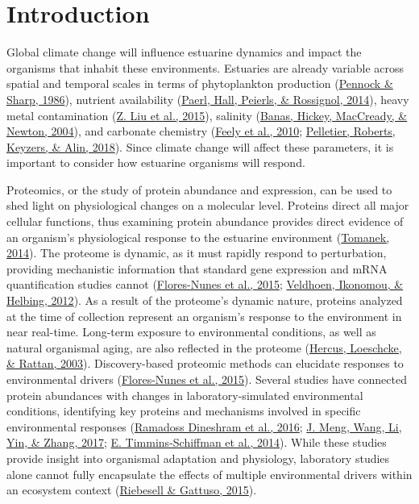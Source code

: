 \documentclass [11pt, proquest] {uwthesis}[2015/03/03]
\begin{document}
\hypertarget{introduction-1}{%
\section{Introduction}\label{introduction-1}}

Global climate change will influence estuarine dynamics and impact the organisms that inhabit these environments. Estuaries are already variable across spatial and temporal scales in terms of phytoplankton production (\protect\hyperlink{ref-Pennock1986}{Pennock \& Sharp, 1986}), nutrient availability (\protect\hyperlink{ref-Paerl2014}{Paerl, Hall, Peierls, \& Rossignol, 2014}), heavy metal contamination (\protect\hyperlink{ref-Liu2015}{Z. Liu et al., 2015}), salinity (\protect\hyperlink{ref-Banas2004}{Banas, Hickey, MacCready, \& Newton, 2004}), and carbonate chemistry (\protect\hyperlink{ref-Feely2010}{Feely et al., 2010}; \protect\hyperlink{ref-Pelletier2018}{Pelletier, Roberts, Keyzers, \& Alin, 2018}). Since climate change will affect these parameters, it is important to consider how estuarine organisms will respond.

Proteomics, or the study of protein abundance and expression, can be used to shed light on physiological changes on a molecular level. Proteins direct all major cellular functions, thus examining protein abundance provides direct evidence of an organism's physiological response to the estuarine environment (\protect\hyperlink{ref-Tomanek2014}{Tomanek, 2014}). The proteome is dynamic, as it must rapidly respond to perturbation, providing mechanistic information that standard gene expression and mRNA quantification studies cannot (\protect\hyperlink{ref-Flores-Nunes2015}{Flores-Nunes et al., 2015}; \protect\hyperlink{ref-Veldhoen2012}{Veldhoen, Ikonomou, \& Helbing, 2012}). As a result of the proteome's dynamic nature, proteins analyzed at the time of collection represent an organism's response to the environment in near real-time. Long-term exposure to environmental conditions, as well as natural organismal aging, are also reflected in the proteome (\protect\hyperlink{ref-Hercus2003}{Hercus, Loeschcke, \& Rattan, 2003}). Discovery-based proteomic methods can elucidate responses to environmental drivers (\protect\hyperlink{ref-Flores-Nunes2015}{Flores-Nunes et al., 2015}). Several studies have connected protein abundances with changes in laboratory-simulated environmental conditions, identifying key proteins and mechanisms involved in specific environmental responses (\protect\hyperlink{ref-Dineshram2016}{Ramadoss Dineshram et al., 2016}; \protect\hyperlink{ref-Meng2017}{J. Meng, Wang, Li, Yin, \& Zhang, 2017}; \protect\hyperlink{ref-Timmins-Schiffman2014}{E. Timmins-Schiffman et al., 2014}). While these studies provide insight into organismal adaptation and physiology, laboratory studies alone cannot fully encapsulate the effects of multiple environmental drivers within an ecosystem context (\protect\hyperlink{ref-Riebesell2015}{Riebesell \& Gattuso, 2015}).
\end{document}
